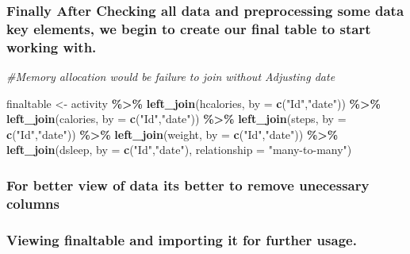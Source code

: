 \documentclass[
]{article}
\newenvironment{Shaded}{\begin{snugshade}}{\end{snugshade}}
\newcommand{\AttributeTok}[1]{\textcolor[rgb]{0.13,0.29,0.53}{#1}}
\newcommand{\CommentTok}[1]{\textcolor[rgb]{0.56,0.35,0.01}{\textit{#1}}}
\newcommand{\FunctionTok}[1]{\textcolor[rgb]{0.13,0.29,0.53}{\textbf{#1}}}
\newcommand{\NormalTok}[1]{#1}
\newcommand{\OtherTok}[1]{\textcolor[rgb]{0.56,0.35,0.01}{#1}}
\newcommand{\SpecialCharTok}[1]{\textcolor[rgb]{0.81,0.36,0.00}{\textbf{#1}}}
\newcommand{\StringTok}[1]{\textcolor[rgb]{0.31,0.60,0.02}{#1}}
\begin{document}
\subsubsection{Finally After Checking all data and preprocessing some
data key elements, we begin to create our final table to start working
with.}\label{finally-after-checking-all-data-and-preprocessing-some-data-key-elements-we-begin-to-create-our-final-table-to-start-working-with.}

\begin{Shaded}
\begin{Highlighting}[]
\CommentTok{\#Memory allocation would be failure to join without Adjusting date}

\NormalTok{finaltable }\OtherTok{\textless{}{-}}\NormalTok{ activity }\SpecialCharTok{\%\textgreater{}\%}
  \FunctionTok{left\_join}\NormalTok{(hcalories, }\AttributeTok{by =} \FunctionTok{c}\NormalTok{(}\StringTok{"Id"}\NormalTok{,}\StringTok{"date"}\NormalTok{)) }\SpecialCharTok{\%\textgreater{}\%}
  \FunctionTok{left\_join}\NormalTok{(calories, }\AttributeTok{by =} \FunctionTok{c}\NormalTok{(}\StringTok{"Id"}\NormalTok{,}\StringTok{"date"}\NormalTok{)) }\SpecialCharTok{\%\textgreater{}\%}
  \FunctionTok{left\_join}\NormalTok{(steps, }\AttributeTok{by =} \FunctionTok{c}\NormalTok{(}\StringTok{"Id"}\NormalTok{,}\StringTok{"date"}\NormalTok{)) }\SpecialCharTok{\%\textgreater{}\%}
  \FunctionTok{left\_join}\NormalTok{(weight, }\AttributeTok{by =} \FunctionTok{c}\NormalTok{(}\StringTok{"Id"}\NormalTok{,}\StringTok{"date"}\NormalTok{)) }\SpecialCharTok{\%\textgreater{}\%}
  \FunctionTok{left\_join}\NormalTok{(dsleep, }\AttributeTok{by =} \FunctionTok{c}\NormalTok{(}\StringTok{"Id"}\NormalTok{,}\StringTok{"date"}\NormalTok{), }\AttributeTok{relationship =} \StringTok{"many{-}to{-}many"}\NormalTok{)}
\end{Highlighting}
\end{Shaded}

\subsubsection{For better view of data its better to remove unecessary
columns}\label{for-better-view-of-data-its-better-to-remove-unecessary-columns}

\subsubsection{Viewing finaltable and importing it for further
usage.}\label{viewing-finaltable-and-importing-it-for-further-usage.}
\end{document}

